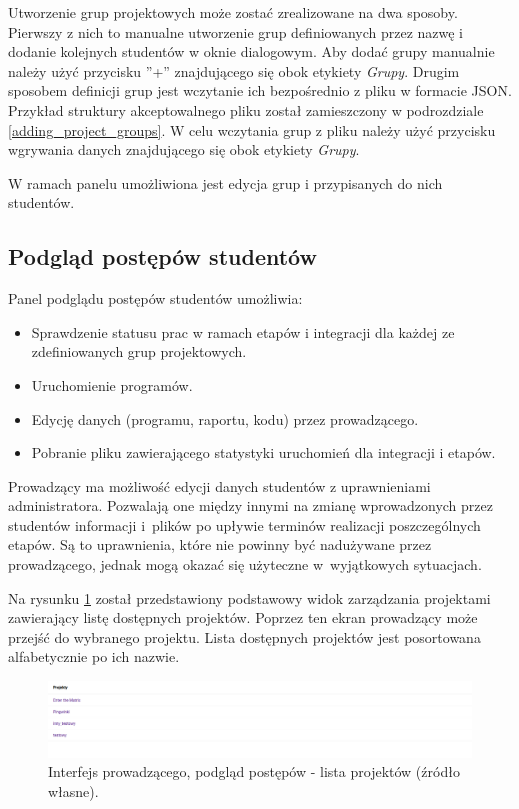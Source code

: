 Utworzenie grup projektowych może zostać zrealizowane na dwa sposoby.
Pierwszy z nich to manualne utworzenie grup definiowanych przez nazwę i dodanie kolejnych studentów w oknie dialogowym.
Aby dodać grupy manualnie należy użyć przycisku ”+” znajdującego się obok etykiety \textit{Grupy}.
Drugim sposobem definicji grup jest wczytanie ich bezpośrednio z pliku w formacie JSON.
Przykład struktury akceptowalnego pliku został zamieszczony w podrozdziale \ref{adding_project_groups}.
W celu wczytania grup z pliku należy użyć przycisku wgrywania danych znajdującego się obok etykiety \textit{Grupy}.

W ramach panelu umożliwiona jest edycja grup i przypisanych do nich studentów.

\subsection{Podgląd postępów studentów}
\label{lecturer_preview}

Panel podglądu postępów studentów umożliwia:
\begin {itemize}
    \item Sprawdzenie statusu prac w ramach etapów i integracji dla każdej ze zdefiniowanych grup projektowych.
    \item Uruchomienie programów.
    \item Edycję danych (programu, raportu, kodu) przez prowadzącego.
    \item Pobranie pliku zawierającego statystyki uruchomień dla integracji i etapów.
\end {itemize}

Prowadzący ma możliwość edycji danych studentów z uprawnieniami administratora.
Pozwalają one między innymi na zmianę wprowadzonych przez studentów informacji i~plików po upływie terminów realizacji poszczególnych etapów.
Są to uprawnienia, które nie powinny być nadużywane przez prowadzącego, jednak mogą okazać się użyteczne w~wyjątkowych sytuacjach.

Na rysunku \ref{fig:lecturer_preview_projects_list} został przedstawiony podstawowy widok zarządzania projektami zawierający listę dostępnych projektów.
Poprzez ten ekran prowadzący może przejść do wybranego projektu.
Lista dostępnych projektów jest posortowana alfabetycznie po ich nazwie.

\begin{figure}[h]
    \centering
    \includegraphics[width = 13cm]{chapter04/lecturer_preview_projects_list.png}
    \caption{Interfejs prowadzącego, podgląd postępów - lista projektów (źródło własne).}
    \label{fig:lecturer_preview_projects_list}
\end{figure}


